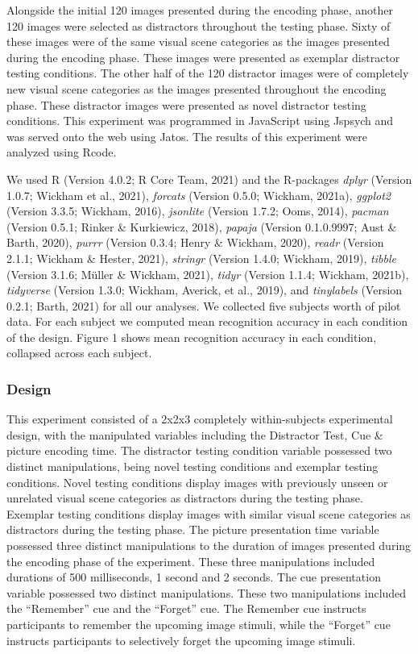 \documentclass[
  english,
  man,floatsintext]{apa6}
\begin{document}
Alongside the initial 120 images presented during the encoding phase, another 120 images were selected as distractors throughout the testing phase. Sixty of these images were of the same visual scene categories as the images presented during the encoding phase. These images were presented as exemplar distractor testing conditions. The other half of the 120 distractor images were of completely new visual scene categories as the images presented throughout the encoding phase. These distractor images were presented as novel distractor testing conditions. This experiment was programmed in JavaScript using Jspsych and was served onto the web using Jatos. The results of this experiment were analyzed using Rcode.

We used R (Version 4.0.2; R Core Team, 2021) and the R-packages \emph{dplyr} (Version 1.0.7; Wickham et al., 2021), \emph{forcats} (Version 0.5.0; Wickham, 2021a), \emph{ggplot2} (Version 3.3.5; Wickham, 2016), \emph{jsonlite} (Version 1.7.2; Ooms, 2014), \emph{pacman} (Version 0.5.1; Rinker \& Kurkiewicz, 2018), \emph{papaja} (Version 0.1.0.9997; Aust \& Barth, 2020), \emph{purrr} (Version 0.3.4; Henry \& Wickham, 2020), \emph{readr} (Version 2.1.1; Wickham \& Hester, 2021), \emph{stringr} (Version 1.4.0; Wickham, 2019), \emph{tibble} (Version 3.1.6; Müller \& Wickham, 2021), \emph{tidyr} (Version 1.1.4; Wickham, 2021b), \emph{tidyverse} (Version 1.3.0; Wickham, Averick, et al., 2019), and \emph{tinylabels} (Version 0.2.1; Barth, 2021) for all our analyses. We collected five subjects worth of pilot data. For each subject we computed mean recognition accuracy in each condition of the design. Figure 1 shows mean recognition accuracy in each condition, collapsed across each subject.

\hypertarget{design}{%
\subsubsection{Design}\label{design}}

This experiment consisted of a 2x2x3 completely within-subjects experimental design, with the manipulated variables including the Distractor Test, Cue \& picture encoding time. The distractor testing condition variable possessed two distinct manipulations, being novel testing conditions and exemplar testing conditions. Novel testing conditions display images with previously unseen or unrelated visual scene categories as distractors during the testing phase. Exemplar testing conditions display images with similar visual scene categories as distractors during the testing phase. The picture presentation time variable possessed three distinct manipulations to the duration of images presented during the encoding phase of the experiment. These three manipulations included durations of 500 milliseconds, 1 second and 2 seconds. The cue presentation variable possessed two distinct manipulations. These two manipulations included the \enquote{Remember} cue and the \enquote{Forget} cue. The Remember cue instructs participants to remember the upcoming image stimuli, while the \enquote{Forget} cue instructs participants to selectively forget the upcoming image stimuli.
\end{document}
